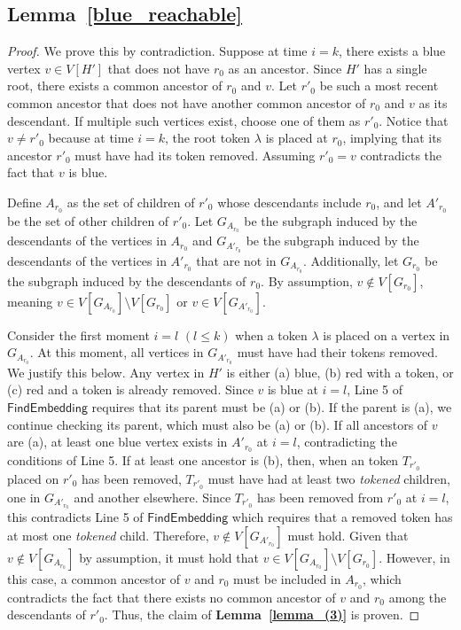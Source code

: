\documentclass[runningheads]{llncs}
\theoremstyle{plain}
\theoremstyle{definition}
\begin{document}
\subsection{\textbf{Lemma~\ref{blue_reachable}}}
\begin{proof}
    We prove this by contradiction. Suppose at time $i = k$, there exists a blue vertex $v \in V[H']$ that does not have $r_0$ as an ancestor. Since $H'$ has a single root, there exists a common ancestor of $r_0$ and $v$. Let $r'_0$ be such a most recent common ancestor that does not have another common ancestor of $r_0$ and $v$ as its descendant. If multiple such vertices exist, choose one of them as $r'_0$. Notice that $v \neq r'_0$ because at time $i = k$, the root token $\lambda$ is placed at $r_0$, implying that its ancestor $r'_0$ must have had its token removed. Assuming $r'_0 = v$ contradicts the fact that $v$ is blue.
    
    Define $A_{r_0}$ as the set of children of $r'_0$ whose descendants include $r_0$, and let $A'_{r_0}$ be the set of other children of $r'_0$. Let $G_{A_{r_0}}$ be the subgraph induced by the descendants of the vertices in $A_{r_0}$ and $G_{A'_{r_0}}$ be the subgraph induced by the descendants of the vertices in $A'_{r_0}$ that are not in $G_{A_{r_0}}$. Additionally, let $G_{r_0}$ be the subgraph induced by the descendants of $r_0$. By assumption, $v \notin V[G_{r_0}]$, meaning $v \in V[G_{A_{r_0}}] \setminus V[G_{r_0}]$ or $v \in V[G_{A'_{r_0}}]$.
    
    Consider the first moment $i = l$ $(l \leq k)$ when a token $\lambda$ is placed on a vertex in $G_{A_{r_0}}$. At this moment, all vertices in $G_{A'_{r_0}}$ must have had their tokens removed. We justify this below. Any vertex in $H'$ is either (a) blue, (b) red with a token, or (c) red and a token is already removed. Since $v$ is blue at $i = l$, Line 5 of $\mathsf{FindEmbedding}$ requires that its parent must be (a) or (b). If the parent is (a), we continue checking its parent, which must also be (a) or (b). If all ancestors of $v$ are (a), at least one blue vertex exists in $A'_{r_0}$ at $i = l$, contradicting the conditions of Line 5. If at least one ancestor is (b), then, when an token $T_{r'_0}$ placed on $r'_0$ has been removed, $T_{r'_0}$ must have had at least two \textit{tokened} children, one in $G_{A'_{r_0}}$ and another elsewhere. Since $T_{r'_0}$ has been removed from $r'_0$ at $i = l$, this contradicts Line 5 of $\mathsf{FindEmbedding}$ which requires that a removed token has at most one \textit{tokened} child. Therefore, $v \notin V[G_{A'_{r_0}}]$ must hold. Given that $v \notin V[G_{A_{r_0}}]$ by assumption, it must hold that $v \in V[G_{A_{r_0}}] \setminus V[G_{r_0}]$. However, in this case, a common ancestor of $v$ and $r_0$ must be included in $A_{r_0}$, which contradicts the fact that there exists no common ancestor of $v$ and $r_0$ among the descendants of $r'_0$. Thus, the claim of \textbf{Lemma~\ref{lemma_(3)}} is proven.
\end{proof}
\end{document}
